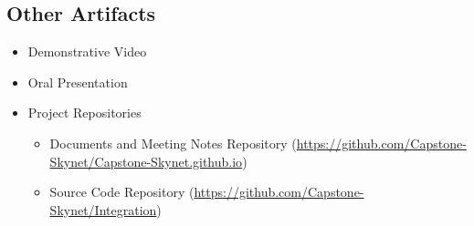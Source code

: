 \documentclass[10pt,letterpaper]{article}
\begin{document}
\subsection{Other Artifacts}
\begin{itemize}
\item Demonstrative Video
\item Oral Presentation
\item Project Repositories
\begin{itemize}
\item Documents and Meeting Notes Repository ({\url{https://github.com/Capstone-Skynet/Capstone-Skynet.github.io}})
\item Source Code Repository ({\url{https://github.com/Capstone-Skynet/Integration}})
\end{itemize}
\end{itemize}

\end{document}
